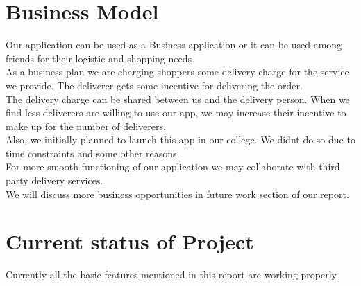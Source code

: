 \documentclass{report}
\begin{document}
\chapter{Business Model}
\bigskip
\bigskip
\bigskip
 Our application can be used as a Business application or it can be used among friends for their logistic and shopping  needs.\\

As a business plan we are charging shoppers some delivery charge for the service we provide. The deliverer gets some incentive for delivering the order.\\

The delivery charge can be shared between us and the delivery person. When we find less deliverers are willing to use our app, we may increase their incentive to make up for the number of deliverers. \\

Also, we initially planned to launch this app in our college. We didn\textquotesingle t do so due to time constraints and some other reasons.\\

For more smooth functioning of our application we may collaborate with third party delivery services.\\

We will discuss more business opportunities in future work section of our report.\\


\chapter{Current status of Project}
\bigskip
\bigskip
\bigskip
\bigskip

Currently all the basic features mentioned in this report are working properly.\\
\end{document}
